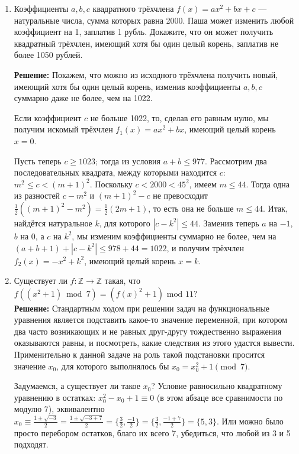 \documentclass[a4paper,12pt]{article}
\begin{document}
\begin{enumerate}[label=\textbf{Задача \arabic*.}]
\item Коэффициенты $a, b, c$ квадратного трёхчлена $f(x) = ax^2 + bx + c$ --- натуральные числа, сумма которых равна 2000. Паша может изменить любой коэффициент на 1, заплатив 1 рубль. Докажите, что он может получить квадратный трёхчлен, имеющий хотя бы один целый корень, заплатив не более 1050 рублей.

\textbf{Решение:} Покажем, что можно из исходного трёхчлена получить новый, имеющий хотя бы один целый корень, изменив коэффициенты $a, b, c$ суммарно даже не более, чем на 1022.

Если коэффициент $c$ не больше 1022, то, сделав его равным нулю, мы получим искомый трёхчлен $f_1(x) = ax^2+bx$, имеющий целый корень $x=0$.

Пусть теперь $c \ge 1023$; тогда из условия $a+b \le 977$. Рассмотрим два последовательных квадрата, между которыми находится $c$: $m^2 \le c < (m+1)^2$. Поскольку $c < 2000 < 45^2$, имеем $m \le 44$. Тогда одна из разностей $c-m^2$ и $(m+1)^2-c$ не превосходит $\frac{1}{2}((m+1)^2 - m^2) = \frac{1}{2}(2m+1)$, то есть она не больше $m \le 44$. Итак, найдётся натуральное $k$, для которого $|c-k^2| \le 44$. Заменив теперь $a$ на $-1$, $b$ на $0$, а $c$ на $k^2$, мы изменим коэффициенты суммарно не более, чем на $(a+b+1) + |c-k^2| \le 978 + 44 = 1022$, и получим трёхчлен $f_2(x) = -x^2+k^2$, имеющий целый корень $x=k$.

\item Существует ли $f: \mathbb{Z} \longrightarrow \mathbb{Z}$ такая, что $f((x^2+1)\, \text{ mod }\, 7) = (f(x)^2 + 1) \text{ mod 11}$? \\
\textbf{Решение:} Стандартным ходом при решении задач на функциональные уравнения является подставить какое-то значение переменной, при котором два часто возникающих и не равных друг-другу тождественно выражения оказываются равны, и посмотреть, какие следствия из этого удастся вывести. Применительно к данной задаче на роль такой подстановки просится значение $x_0$, для которого выполнялось бы $x_0 = x_0^2 + 1 \pmod{7}$.

Задумаемся, а существует ли такое $x_0$? Условие равносильно квадратному уравнению в остатках: $x_0^2 - x_0 + 1 \equiv 0$ (в этом абзаце все сравнимости по модулю 7), эквивалентно $x_0 \equiv \frac{1 \pm \sqrt{-3}}{2} = \frac{1 \pm \sqrt{-3+7}}{2} = \{\frac{3}{2}, \frac{-1}{2}\} = \{\frac{3}{2}, \frac{-1+7}{2}\} = \{5, 3\}$. Или можно было просто перебором остатков, благо их всего 7, убедиться, что любой из 3 и 5 подходят.


\end{enumerate}
\end{document}
